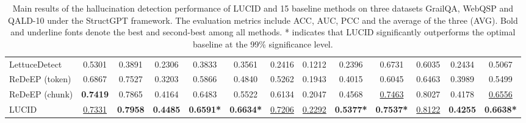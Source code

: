 \documentclass[11pt]{article}
\begin{document}
\begin{table}[t]
{\begin{tabular}{l | c c c c | c c c c | c c c c}
LettuceDetect & 0.5301 & 0.3891 & 0.2306 & 0.3833 & 0.3561 & 0.2416 & 0.1212 & 0.2396 & 0.6731 & 0.6035 & 0.2434 & 0.5067 \\
ReDeEP (token) & 0.6867 & 0.7527 & 0.3203 & 0.5866 & 0.4840 & 0.5262 & 0.1943 & 0.4015 & 0.6045 & 0.6463 & 0.3989 & 0.5499 \\
ReDeEP (chunk) & \textbf{0.7419} & 0.7865 & 0.4164 & 0.6483 & 0.5522 & 0.6134 & 0.2047 & 0.4568 & \underline{0.7463} & 0.8027 & 0.4178 & \underline{0.6556} \\
\hline
LUCID & \underline{0.7331} & \textbf{0.7958} & \textbf{0.4485} & \textbf{0.6591*} & \textbf{0.6634*} & \underline{0.7206} & \underline{0.2292} & \textbf{0.5377*} & \textbf{0.7537*} & \underline{0.8122} & \textbf{0.4255} & \textbf{0.6638*} \\
\hline
\end{tabular}
}
\caption{\label{tab:main-StructGPT}
Main results of the hallucination detection performance of LUCID and 15 baseline methods on three datasets GrailQA, WebQSP and QALD-10 under the StructGPT framework. The evaluation metrics include ACC, AUC, PCC and the average of the three (AVG). Bold and underline fonts denote the best and second-best among all methods. * indicates that LUCID significantly outperforms the optimal baseline at the 99\% significance level.
}
\end{table}
\end{document}
